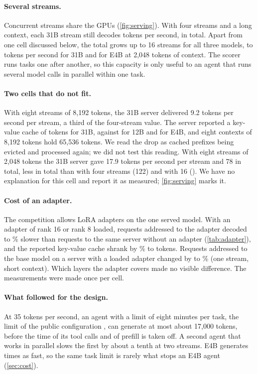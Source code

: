 \paragraph{Several streams.} Concurrent streams share the GPUs (\cref{fig:serving}). With four streams and a long
context, each 31B stream still decodes \ServeBigFourPer{} tokens per second, \ServeBigFourAgg{} in total. Apart
from one cell discussed below, the total grows up to 16 streams for all three models, to \ServeBigSixteenAgg{} tokens per second for 31B and
\ServeSmallSixteenAgg{} for E4B at 2,048 tokens of context. The scorer runs tasks one after another, so this capacity
is only useful to an agent that runs several model calls in parallel within one task.

\paragraph{Two cells that do not fit.} With eight streams of 8,192 tokens, the 31B server delivered 9.2 tokens per
second per stream, a third of the four-stream value. The server reported a key-value cache of \ServeBigKV{} tokens
for 31B, against \ServeMidKV{} for 12B and \ServeSmallKV{} for E4B, and eight contexts of 8,192 tokens hold 65,536
tokens. We read the drop as cached prefixes being evicted and processed again; we did not test this reading. With
eight streams of 2,048 tokens the 31B server gave 17.9 tokens per second per stream and 78 in total, less in total
than with four streams (122) and with 16 (\ServeBigSixteenAgg). We have no explanation for this cell and report it as measured;
\cref{fig:serving} marks it.



\paragraph{Cost of an adapter.} The competition allows LoRA adapters on the one served model. With an adapter of rank
16 or rank 8 loaded, requests addressed to the adapter decoded \AdapterLossMin{} to \AdapterLossMax\% slower than
requests to the same server without an adapter (\cref{tab:adapter}), and the reported key-value cache shrank by
\AdapterKVLoss\% to \AdapterKV{} tokens. Requests addressed to the base model on a server with a loaded adapter
changed by \AdapterBaseMin{} to \AdapterBaseMax\% (one stream, short context). Which layers the adapter covers made no visible difference. The
measurements were made once per cell.

\paragraph{What followed for the design.} At 35 tokens per second, an agent with a limit of eight minutes per task,
the limit of the public configuration , can generate at most about 17,000 tokens, before the time of its tool
calls and of prefill is taken off. A second agent that works in parallel
slows the first by about a tenth at two streams. E4B generates \ServeRatioSmallBig{} times as fast, so the same task
limit is rarely what stops an E4B agent (\cref{sec:cost}).
